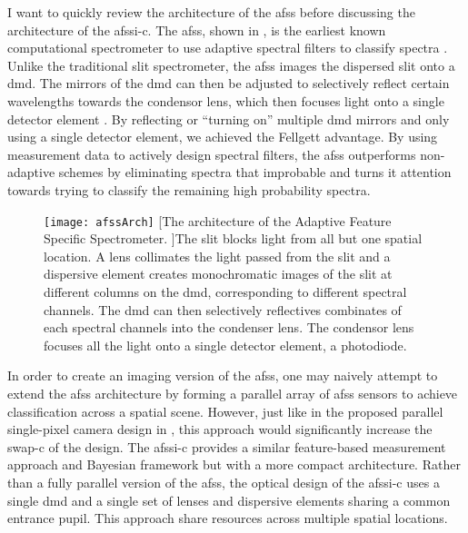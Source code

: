 I want to quickly review the architecture of the \acrfull{afss} before discussing the architecture of the \gls{afssi-c}. The \gls{afss}, shown in , is the earliest known computational spectrometer to use adaptive spectral filters to classify spectra \cite{dinakarababu2011adaptive}. Unlike the traditional slit spectrometer, the \gls{afss} images the dispersed slit onto a \gls{dmd}. The mirrors of the \gls{dmd} can then be adjusted to selectively reflect certain wavelengths towards the condensor lens, which then focuses light onto a single detector element \cite{dinakarababu2011adaptive}. By reflecting or ``turning on'' multiple \gls{dmd} mirrors and only using a single detector element, we achieved the \gls{Fellgett advantage}. By using measurement data to actively design spectral filters, the \gls{afss} outperforms non-adaptive schemes by eliminating spectra that improbable and turns it attention towards trying to classify the remaining high probability spectra. 

\begin{figure}
	\texttt{[image: afssArch]}
	[The architecture of the Adaptive Feature Specific Spectrometer. ]{The slit blocks light from all but one spatial location. A lens collimates the light passed from the slit and a dispersive element creates monochromatic images of the slit at different columns on the \gls{dmd}, corresponding to different spectral channels. The \gls{dmd} can then selectively reflectives combinates of each spectral channels into the condenser lens. The condensor lens focuses all the light onto a single detector element, a photodiode.}
	\label{fig:afssArch}
\end{figure}

In order to create an imaging version of the \gls{afss}, one may naively attempt to extend the \gls{afss} architecture by forming a parallel array of \gls{afss} sensors to achieve classification across a spatial scene. However, just like in the proposed parallel single-pixel camera design in , this approach would significantly increase the \gls{swap-c} of the design. The \gls{afssi-c} provides a similar feature-based measurement approach and Bayesian framework but with a more compact architecture. Rather than a fully parallel version of the \gls{afss}, the optical design of the \gls{afssi-c} uses a single \gls{dmd} and a single set of lenses and dispersive elements sharing a common entrance pupil. This approach share resources across multiple spatial locations.


